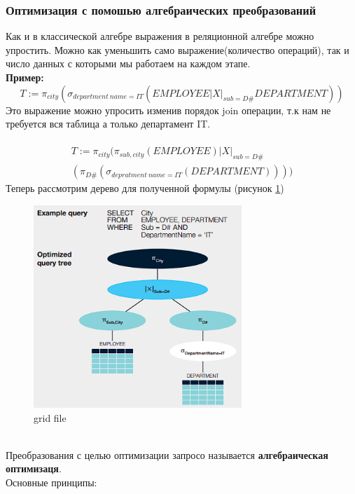 \documentclass{article}
\begin{document}
\subsubsection{Оптимизация с помошью алгебраических преобразований}
Как и в классической алгебре выражения в реляционной алгебре можно упростить. Можно как уменьшить само выражение(количество операций), так и число данных с которыми мы работаем на каждом этапе.\\
\textbf{Пример:}\\
\begin{equation}
        T:= \pi_{city} (\sigma_{department\:name = IT} (EMPLOYEE |X|_{sub = D\#} DEPARTMENT))
\end{equation}
Это выражение можно упросить изменив порядок join операции, т.к нам не требуется вся таблица а только департамент IT.\\\\
\begin{eqnarray}
        T:= \pi_{city}(\pi_{sub,city}(EMPLOYEE)|X|_{sub = D\#} \\\nonumber(\pi_{D\#}(\sigma_{depratment\:name = IT}(DEPARTMENT))))
\end{eqnarray}
Теперь рассмотрим дерево для полученной формулы (рисунок \ref{img6})
\begin{figure}[h]
    \centering
    \includegraphics[width=0.7\textwidth]{images/tree_optim.png}
    \caption{grid file}
    \label{img6}
\end{figure}\\
Преобразования с целью оптимизации запросо называется \textbf{алгебраическая оптимизаця}.\\
Основные принципы:
\end{document}
